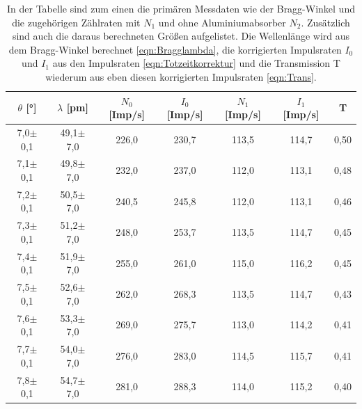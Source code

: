 \documentclass[titlepage = firstcover]{scrartcl}
\begin{document}
    \begin{table}[h]
        \centering
        \caption{In der Tabelle sind zum einen die primären Messdaten wie der Bragg-Winkel und die zugehörigen Zählraten mit $N_1$ und ohne Aluminiumabsorber $N_2$. Zusätzlich sind auch die daraus berechneten Größen aufgelistet. Die Wellenlänge wird aus dem Bragg-Winkel berechnet \ref{eqn:Bragglambda}, die korrigierten Impulsraten $I_0$ und $I_1$ aus den Impulsraten \ref{eqn:Totzeitkorrektur} und die Transmission T wiederum aus eben diesen korrigierten Impulsraten \ref{eqn:Trans}.}
        \label{tab:Transmission}

        \begin{tabular}{c c c c c c c}
            \toprule
            {$\theta$ [°]}  & {$\lambda$ [pm]} & {$N_0$ [Imp/s]} & {$I_0$ [Imp/s]} & {$N_1$ [Imp/s]} & {$I_1$ [Imp/s]} & {T} \\ 
            \midrule
            7,0$\pm$ 0,1                &  49,1$\pm$ 7,0              &  226,0          &    230,7       &    113,5        &    114,7       &  0,50 \\
            7,1$\pm$ 0,1                &  49,8$\pm$ 7,0              &  232,0          &    237,0       &    112,0        &    113,1       &  0,48 \\
            7,2$\pm$ 0,1                &  50,5$\pm$ 7,0              &  240,5          &    245,8       &    112,0        &    113,1       &  0,46 \\
            7,3$\pm$ 0,1                &  51,2$\pm$ 7,0              &  248,0          &    253,7       &    113,5        &    114,7       &  0,45 \\
            7,4$\pm$ 0,1                &  51,9$\pm$ 7,0              &  255,0          &    261,0       &    115,0        &    116,2       &  0,45 \\
            7,5$\pm$ 0,1                &  52,6$\pm$ 7,0              &  262,0          &    268,3       &    113,5        &    114,7       &  0,43 \\
            7,6$\pm$ 0,1                &  53,3$\pm$ 7,0              &  269,0          &    275,7       &    113,0        &    114,2       &  0,41 \\
            7,7$\pm$ 0,1                &  54,0$\pm$ 7,0              &  276,0          &    283,0       &    114,5        &    115,7       &  0,41 \\
            7,8$\pm$ 0,1                &  54,7$\pm$ 7,0              &  281,0          &    288,3       &    114,0        &    115,2       &  0,40 \\

\end{tabular}
\end{table}
\end{document}
